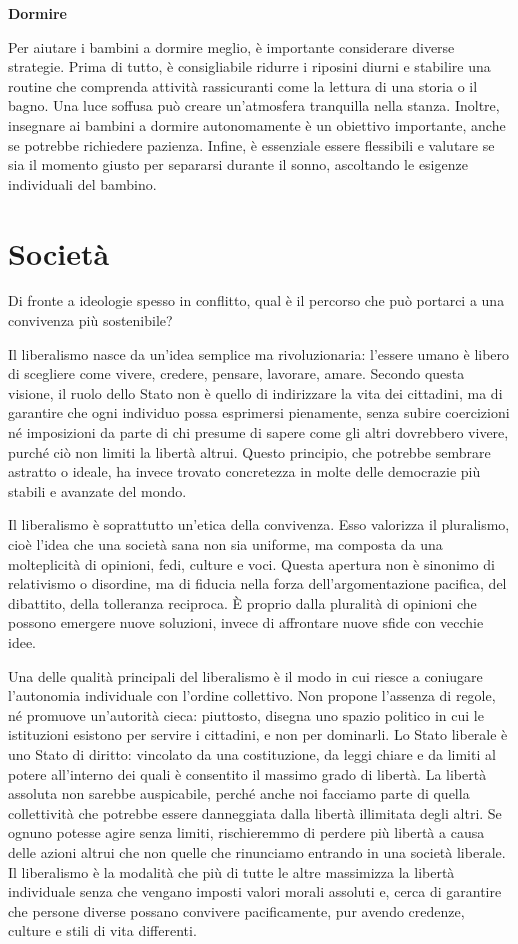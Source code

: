 \documentclass[12pt]{book} %
\begin{document}
\textbf{Dormire}

Per aiutare i bambini a dormire meglio, è importante considerare diverse strategie. Prima di tutto, è consigliabile
ridurre i riposini diurni e stabilire una routine che comprenda attività rassicuranti come la lettura di una storia o
il bagno. Una luce soffusa può creare un'atmosfera tranquilla nella stanza. Inoltre, insegnare ai bambini a dormire
autonomamente è un obiettivo importante, anche se potrebbe richiedere pazienza. Infine, è essenziale essere flessibili
e valutare se sia il momento giusto per separarsi durante il sonno, ascoltando le esigenze individuali del bambino.

\clearpage\section{Società}
Di fronte a ideologie spesso in conflitto, qual è il percorso che può portarci a una convivenza più sostenibile?

Il liberalismo nasce da un’idea semplice ma rivoluzionaria: l’essere umano è libero di scegliere come vivere, credere, pensare, lavorare, amare. Secondo questa visione, il ruolo dello Stato non è quello di indirizzare la vita dei cittadini, ma di garantire che ogni individuo possa esprimersi pienamente, senza subire coercizioni né imposizioni da parte di chi presume di sapere come gli altri dovrebbero vivere, purché ciò non limiti la libertà altrui. Questo principio, che potrebbe sembrare astratto o ideale, ha invece trovato concretezza in molte delle democrazie più stabili e avanzate del mondo.

Il liberalismo è soprattutto un’etica della convivenza. Esso valorizza il pluralismo, cioè l’idea che una società sana non sia uniforme, ma composta da una molteplicità di opinioni, fedi, culture e voci. Questa apertura non è sinonimo di relativismo o disordine, ma di fiducia nella forza dell’argomentazione pacifica, del dibattito, della tolleranza reciproca. È proprio dalla pluralità di opinioni che possono emergere nuove soluzioni, invece di affrontare nuove sfide con vecchie idee.

Una delle qualità principali del liberalismo è il modo in cui riesce a coniugare l'autonomia individuale con l'ordine collettivo. Non propone l’assenza di regole, né promuove un’autorità cieca: piuttosto, disegna uno spazio politico in cui le istituzioni esistono per servire i cittadini, e non per dominarli. Lo Stato liberale è uno Stato di diritto: vincolato da una costituzione, da leggi chiare e da limiti al potere all'interno dei quali è consentito il massimo grado di libertà. La libertà assoluta non sarebbe auspicabile, perché anche noi facciamo parte di quella collettività che potrebbe essere danneggiata dalla libertà illimitata degli altri. Se ognuno potesse agire senza limiti, rischieremmo di perdere più libertà a causa delle azioni altrui che non quelle che rinunciamo entrando in una società liberale. Il liberalismo è la modalità che più di tutte le altre massimizza la libertà individuale senza che vengano imposti valori morali assoluti e, cerca di garantire che persone diverse possano convivere pacificamente, pur avendo credenze, culture e stili di vita differenti.
\end{document}
